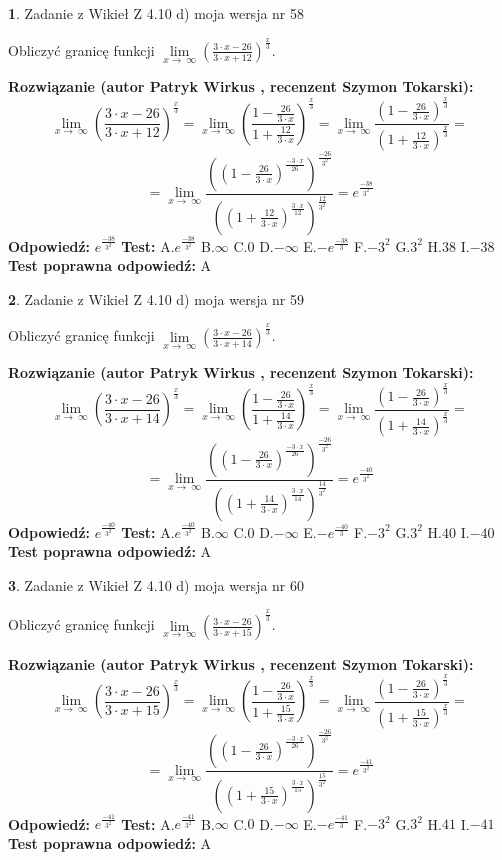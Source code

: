 \documentclass[12pt, a4paper]{article}
\theoremstyle{definition} %
\newtheorem{zad}{}
\newcommand{\zadStart}[1]{\begin{zad}#1\newline}
\newcommand{\zadStop}{\end{zad}}
\newcommand{\rozwStart}[2]{\noindent \textbf{Rozwiązanie (autor #1 , recenzent #2): }\newline}
\newcommand{\rozwStop}{\newline}
\newcommand{\odpStart}{\noindent \textbf{Odpowiedź:}\newline}
\newcommand{\odpStop}{\newline}
\newcommand{\testStart}{\noindent \textbf{Test:}\newline}
\newcommand{\testStop}{\newline}
\newcommand{\kluczStart}{\noindent \textbf{Test poprawna odpowiedź:}\newline}
\newcommand{\kluczStop}{\newline}
\begin{document}
\zadStart{Zadanie z Wikieł Z 4.10 d) moja wersja nr 58}


Obliczyć granicę funkcji  $\lim\limits_{x\to\ \infty}(\frac{3\cdot x-26}{3\cdot x+12})^{\frac{x}{3}}$.
\zadStop
\rozwStart{Patryk Wirkus}{Szymon Tokarski}
$$\lim\limits_{x\to\ \infty}(\frac{3\cdot x-26}{3\cdot x+12})^{\frac{x}{3}} = \lim\limits_{x\to\ \infty}(\frac{1-\frac{26}{3\cdot x}}{1+\frac{12}{3\cdot x}})^{\frac{x}{3}}=\lim\limits_{x\to\ \infty}\frac{(1-\frac{26}{3\cdot x})^{\frac{x}{3}}}{(1+\frac{12}{3\cdot x})^{\frac{x}{3}}}=$$
$$=\lim\limits_{x\to\ \infty}\frac{((1-\frac{26}{3\cdot x})^{\frac{-3\cdot x}{26}})^{\frac{-26}{3^{2}}}}{((1+\frac{12}{3\cdot x})^{\frac{3\cdot x}{12}})^{\frac{12}{3^{2}}}}=e^{\frac{-38}{3^{2}}}$$
\rozwStop
\odpStart
$e^{\frac{-38}{3^{2}}}$
\odpStop
\testStart
A.$e^{\frac{-38}{3^{2}}}$ B.$\infty$ C.$0$ D.$-\infty$ E.$-e^{\frac{-38}{3}}$
F.$-3^{2}$ G.$3^{2}$
H.$38$
I.$-38$
\testStop
\kluczStart
A
\kluczStop



\zadStart{Zadanie z Wikieł Z 4.10 d) moja wersja nr 59}


Obliczyć granicę funkcji  $\lim\limits_{x\to\ \infty}(\frac{3\cdot x-26}{3\cdot x+14})^{\frac{x}{3}}$.
\zadStop
\rozwStart{Patryk Wirkus}{Szymon Tokarski}
$$\lim\limits_{x\to\ \infty}(\frac{3\cdot x-26}{3\cdot x+14})^{\frac{x}{3}} = \lim\limits_{x\to\ \infty}(\frac{1-\frac{26}{3\cdot x}}{1+\frac{14}{3\cdot x}})^{\frac{x}{3}}=\lim\limits_{x\to\ \infty}\frac{(1-\frac{26}{3\cdot x})^{\frac{x}{3}}}{(1+\frac{14}{3\cdot x})^{\frac{x}{3}}}=$$
$$=\lim\limits_{x\to\ \infty}\frac{((1-\frac{26}{3\cdot x})^{\frac{-3\cdot x}{26}})^{\frac{-26}{3^{2}}}}{((1+\frac{14}{3\cdot x})^{\frac{3\cdot x}{14}})^{\frac{14}{3^{2}}}}=e^{\frac{-40}{3^{2}}}$$
\rozwStop
\odpStart
$e^{\frac{-40}{3^{2}}}$
\odpStop
\testStart
A.$e^{\frac{-40}{3^{2}}}$ B.$\infty$ C.$0$ D.$-\infty$ E.$-e^{\frac{-40}{3}}$
F.$-3^{2}$ G.$3^{2}$
H.$40$
I.$-40$
\testStop
\kluczStart
A
\kluczStop



\zadStart{Zadanie z Wikieł Z 4.10 d) moja wersja nr 60}


Obliczyć granicę funkcji  $\lim\limits_{x\to\ \infty}(\frac{3\cdot x-26}{3\cdot x+15})^{\frac{x}{3}}$.
\zadStop
\rozwStart{Patryk Wirkus}{Szymon Tokarski}
$$\lim\limits_{x\to\ \infty}(\frac{3\cdot x-26}{3\cdot x+15})^{\frac{x}{3}} = \lim\limits_{x\to\ \infty}(\frac{1-\frac{26}{3\cdot x}}{1+\frac{15}{3\cdot x}})^{\frac{x}{3}}=\lim\limits_{x\to\ \infty}\frac{(1-\frac{26}{3\cdot x})^{\frac{x}{3}}}{(1+\frac{15}{3\cdot x})^{\frac{x}{3}}}=$$
$$=\lim\limits_{x\to\ \infty}\frac{((1-\frac{26}{3\cdot x})^{\frac{-3\cdot x}{26}})^{\frac{-26}{3^{2}}}}{((1+\frac{15}{3\cdot x})^{\frac{3\cdot x}{15}})^{\frac{15}{3^{2}}}}=e^{\frac{-41}{3^{2}}}$$
\rozwStop
\odpStart
$e^{\frac{-41}{3^{2}}}$
\odpStop
\testStart
A.$e^{\frac{-41}{3^{2}}}$ B.$\infty$ C.$0$ D.$-\infty$ E.$-e^{\frac{-41}{3}}$
F.$-3^{2}$ G.$3^{2}$
H.$41$
I.$-41$
\testStop
\kluczStart
A
\kluczStop
\end{document}

